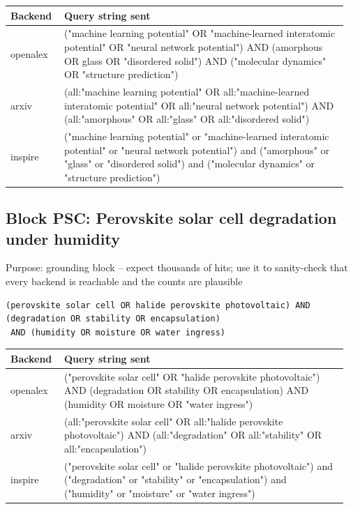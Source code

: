 \documentclass[10pt,a4paper]{article}
\begin{document}
{\scriptsize\begin{longtable}{p{0.151\linewidth}p{0.804\linewidth}}
\hline
\textbf{Backend} & \textbf{Query string sent} \\ \hline
\endhead
openalex & ("machine learning potential" OR "machine-learned interatomic potential" OR "neural network potential") AND (amorphous OR glass OR "disordered solid") AND ("molecular dynamics" OR "structure prediction") \\
arxiv & (all:"machine learning potential" OR all:"machine-learned interatomic potential" OR all:"neural network potential") AND (all:"amorphous" OR all:"glass" OR all:"disordered solid") \\
inspire & ("machine learning potential" or "machine-learned interatomic potential" or "neural network potential") and ("amorphous" or "glass" or "disordered solid") and ("molecular dynamics" or "structure prediction") \\
\hline
\end{longtable}}
\subsection*{Block PSC: Perovskite solar cell degradation under humidity}
Purpose: grounding block -- expect thousands of hits; use it to sanity-check that every backend is reachable and the counts are plausible

\begin{Verbatim}[fontsize=\scriptsize]
(perovskite solar cell OR halide perovskite photovoltaic) AND (degradation OR stability OR encapsulation)
 AND (humidity OR moisture OR water ingress)
\end{Verbatim}
{\scriptsize\begin{longtable}{p{0.151\linewidth}p{0.804\linewidth}}
\hline
\textbf{Backend} & \textbf{Query string sent} \\ \hline
\endhead
openalex & ("perovskite solar cell" OR "halide perovskite photovoltaic") AND (degradation OR stability OR encapsulation) AND (humidity OR moisture OR "water ingress") \\
arxiv & (all:"perovskite solar cell" OR all:"halide perovskite photovoltaic") AND (all:"degradation" OR all:"stability" OR all:"encapsulation") \\
inspire & ("perovskite solar cell" or "halide perovskite photovoltaic") and ("degradation" or "stability" or "encapsulation") and ("humidity" or "moisture" or "water ingress") \\
\hline
\end{longtable}}
\end{document}
